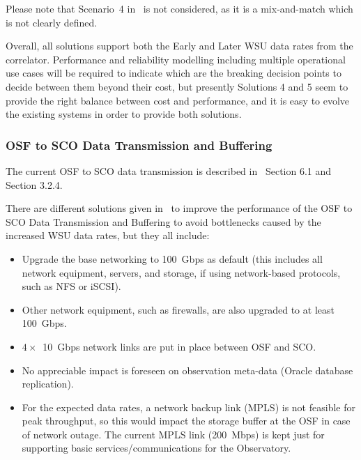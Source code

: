 Please note that Scenario~4 in~\cite{dtas} is not considered, as it is a mix-and-match which is not clearly defined.

Overall, all solutions support both the Early and Later WSU data rates from the correlator. Performance and reliability modelling including multiple operational use cases will be required to indicate which are the breaking decision points to decide between them beyond their cost, but presently Solutions 4 and 5 seem to provide the right balance between cost and performance, and it is easy to evolve the existing systems in order to provide both solutions.


\subsubsection{OSF to SCO Data Transmission and Buffering} %
\label{ssub:osf_to_sco_data_transmission_and_buffering}

The current OSF to SCO data transmission is described in~\cite{dtas} Section 6.1 and~\cite{CSA-IA} Section 3.2.4.

There are different solutions given in~\cite{dtas} to improve the 
performance of the OSF to SCO Data Transmission and Buffering to avoid bottlenecks caused by the increased WSU data rates, but they all include:

\begin{itemize}[itemsep=-0.5em]
	\item Upgrade the base networking to 100~Gbps as default (this includes all network equipment, servers, and storage, if using network-based protocols, such as NFS or iSCSI).
	\item Other network equipment, such as firewalls, are also upgraded to at least 100~Gbps.
	\item $4 \times$~10~Gbps network links are put in place between OSF and SCO.
	\item No appreciable impact is foreseen on observation meta-data (Oracle database replication).
	\item For the expected data rates, a network backup link (MPLS) is not feasible for peak throughput, so this would impact the storage buffer at the OSF in case of network outage. The current MPLS link (200~Mbps) is kept just for supporting basic services/communications for the Observatory.
\end{itemize}

